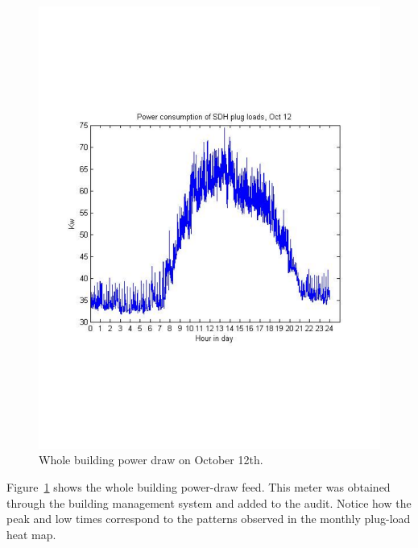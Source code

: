\begin{figure}[htb!]
\begin{center}
\includegraphics[scale=0.4]{figs/WholeOct12}
\caption{Whole building power draw on October 12th.}
\label{fig:wholebuilding}
\end{center}
\end{figure}

Figure~\ref{fig:wholebuilding} shows the whole building power-draw feed.  This meter was obtained through the building
management system and added to the audit.  Notice how the peak and low times correspond to the patterns observed
in the monthly plug-load heat map.


